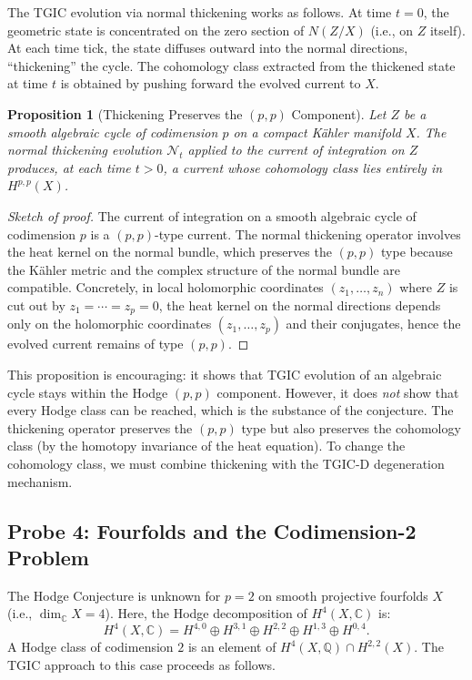 \documentclass[11pt,a4paper]{article}
\theoremstyle{definition}
\theoremstyle{plain}
\newtheorem{proposition}[theorem]{Proposition}
\newcommand{\QQ}{\mathbb{Q}}
\newcommand{\CC}{\mathbb{C}}
\begin{document}
The TGIC evolution via normal thickening works as follows. At time $t = 0$, the geometric state is concentrated on the zero section of $N(Z/X)$ (i.e., on $Z$ itself). At each time tick, the state diffuses outward into the normal directions, ``thickening'' the cycle. The cohomology class extracted from the thickened state at time $t$ is obtained by pushing forward the evolved current to $X$.

\begin{proposition}[Thickening Preserves the $(p,p)$ Component]\label{prop:thicken-pp}
Let $Z$ be a smooth algebraic cycle of codimension $p$ on a compact K\"ahler manifold $X$. The normal thickening evolution $\mathcal{N}_t$ applied to the current of integration on $Z$ produces, at each time $t > 0$, a current whose cohomology class lies entirely in $H^{p,p}(X)$.
\end{proposition}

\begin{proof}[Sketch of proof]
The current of integration on a smooth algebraic cycle of codimension $p$ is a $(p,p)$-type current. The normal thickening operator involves the heat kernel on the normal bundle, which preserves the $(p,p)$ type because the K\"ahler metric and the complex structure of the normal bundle are compatible. Concretely, in local holomorphic coordinates $(z_1, \ldots, z_n)$ where $Z$ is cut out by $z_1 = \cdots = z_p = 0$, the heat kernel on the normal directions depends only on the holomorphic coordinates $(z_1, \ldots, z_p)$ and their conjugates, hence the evolved current remains of type $(p,p)$.
\end{proof}

This proposition is encouraging: it shows that TGIC evolution of an algebraic cycle stays within the Hodge $(p,p)$ component. However, it does \emph{not} show that every Hodge class can be reached, which is the substance of the conjecture. The thickening operator preserves the $(p,p)$ type but also preserves the cohomology class (by the homotopy invariance of the heat equation). To change the cohomology class, we must combine thickening with the TGIC-D degeneration mechanism.

\subsection{Probe 4: Fourfolds and the Codimension-2 Problem}\label{sec:probe4}

The Hodge Conjecture is unknown for $p = 2$ on smooth projective fourfolds $X$ (i.e., $\dim_{\CC} X = 4$). Here, the Hodge decomposition of $H^4(X, \CC)$ is:
\begin{equation}\label{eq:fourfold-hodge}
H^4(X, \CC) = H^{4,0} \oplus H^{3,1} \oplus H^{2,2} \oplus H^{1,3} \oplus H^{0,4}.
\end{equation}
A Hodge class of codimension $2$ is an element of $H^4(X, \QQ) \cap H^{2,2}(X)$. The TGIC approach to this case proceeds as follows.
\end{document}
